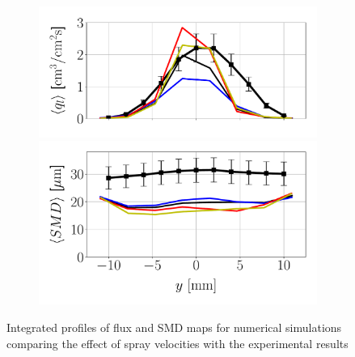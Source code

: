 \begin{figure}[ht]
\begin{subfigure}[b]{0.4\textwidth}
	\flushleft
   \includegraphics[scale=0.35]{./part2_developments/figures_ch6_lagrangian_JICF/params_spray_velocities/profiles/flux_along_y}\\
   \vspace{-0.16in}
   \includegraphics[scale=0.35]{./part2_developments/figures_ch6_lagrangian_JICF/params_spray_velocities/profiles/SMD_along_y}
\end{subfigure}

\caption{Integrated profiles of flux and SMD maps for numerical simulations comparing the effect of spray velocities with the experimental results}
\label{fig:profiles_LGS_JICF_spray_velocities}
\end{figure}


